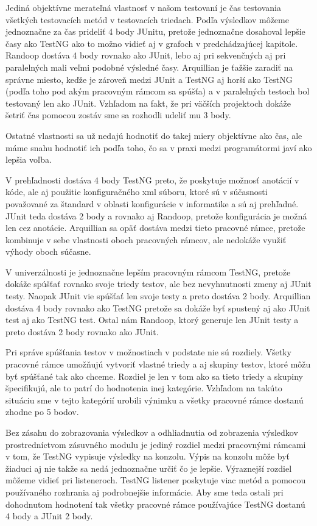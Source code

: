 \documentclass[11pt,twoside,slovak,a4paper]{article}
\begin{document}
	Jediná objektívne merateľná vlastnosť v našom testovaní je čas testovania všetkých testovacích metód v testovacích triedach. Podľa výsledkov môžeme jednoznačne za čas prideliť 4 body JUnitu, pretože jednoznačne dosahoval lepšie časy ako TestNG ako to možno vidieť aj v grafoch v predchádzajúcej kapitole. Randoop dostáva 4 body rovnako ako JUnit, lebo aj pri sekvenčných aj pri paralelných mali veľmi podobné výsledné časy. Arquillian je ťažšie zaradiť na správne miesto, keďže je zároveň medzi JUnit a TestNG aj horší ako TestNG (podľa toho pod akým pracovným rámcom sa spúšťa) a v paralelných testoch bol testovaný len ako JUnit. Vzhľadom na fakt, že pri väčších projektoch dokáže šetriť čas pomocou zostáv sme sa rozhodli udeliť mu 3 body.
	
	Ostatné vlastnosti sa už nedajú hodnotiť do takej miery objektívne ako čas, ale máme snahu hodnotiť ich podľa toho, čo sa v praxi medzi programátormi javí ako lepšia voľba.
	
	V prehľadnosti dostáva 4 body TestNG preto, že poskytuje možnosť anotácií v kóde, ale aj použitie konfiguračného xml súboru, ktoré sú v súčasnosti považované za štandard v oblasti konfigurácie v informatike a sú aj prehľadné. JUnit teda dostáva 2 body a rovnako aj Randoop, pretože konfigurácia je možná len cez anotácie. Arquillian sa opäť dostáva medzi tieto pracovné rámce, pretože kombinuje v sebe vlastnosti oboch pracovných rámcov, ale nedokáže využiť výhody oboch súčasne.
	
	V univerzálnosti je jednoznačne lepším pracovným rámcom TestNG, pretože dokáže spúšťať rovnako svoje triedy testov, ale bez nevyhnutnosti zmeny aj JUnit testy. Naopak JUnit vie spúšťať len svoje testy a preto dostáva 2 body. Arquillian dostáva 4 body rovnako ako TestNG pretože sa dokáže byť spustený aj ako JUnit test aj ako TestNG test. Ostal nám Randoop, ktorý generuje len JUnit testy a preto dostáva 2 body rovnako ako JUnit.
	
	Pri správe spúšťania testov v možnostiach v podstate nie sú rozdiely. Všetky pracovné rámce umožňujú vytvoriť vlastné triedy a aj skupiny testov, ktoré môžu byť spúšťané tak ako chceme. Rozdiel je len v tom ako sa tieto triedy a skupiny špecifikujú, ale to patrí do hodnotenia inej kategórie. Vzhľadom na takúto situáciu sme v tejto kategórií urobili výnimku a všetky pracovné rámce dostanú zhodne po 5 bodov.
	
	Bez zásahu do zobrazovania výsledkov a odhliadnutia od zobrazenia výsledkov prostredníctvom zásuvného modulu je jediný rozdiel medzi pracovnými rámcami v tom, že TestNG vypisuje výsledky na konzolu. Výpis na konzolu môže byť žiaduci aj nie takže sa nedá jednoznačne určiť čo je lepšie. Výraznejší rozdiel môžeme vidieť pri listeneroch. TestNG listener poskytuje viac metód a pomocou používaného rozhrania aj podrobnejšie informácie. Aby sme teda ostali pri dohodnutom hodnotení tak všetky pracovné rámce používajúce TestNG dostanú 4 body a JUnit 2 body.
	
\end{document}
